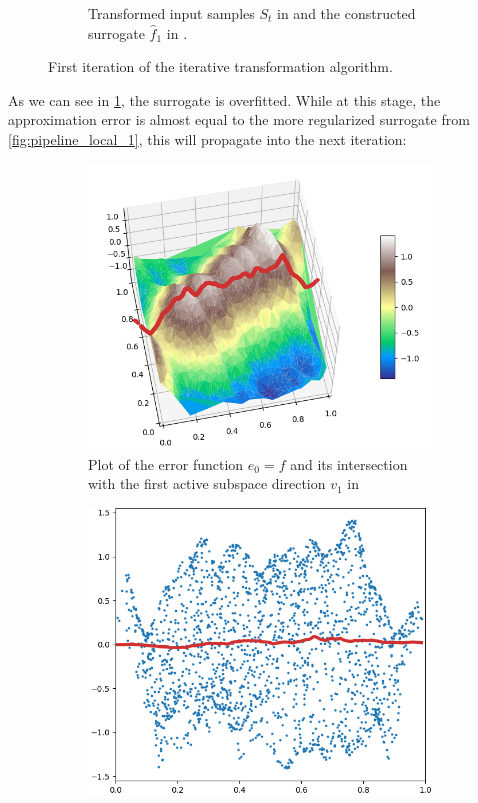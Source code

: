 \documentclass[
  a4paper,  %
  twoside,  %
  bibliography=totoc,
  headsepline,
  cleardoublepage=empty,
  parskip=half,
  draft=false
]{scrbook}
\begin{document}
\begin{mdframed}[style=style]
\begin{figure}[H]
\begin{subfigure}{.5\textwidth}
  \caption{Transformed input samples $S_t$ in \darkblue and the constructed surrogate $\hat{f}_1$ in \red.}
\label{fig:pipeline_bad_local_1}
\end{subfigure}
\delimit
\caption{First iteration of the iterative transformation algorithm.}
\label{fig:pipeline_bad_1}
\end{figure}
\end{mdframed}
%
As we can see in \cref{fig:pipeline_bad_local_1}, the surrogate is overfitted.
While at this stage, the approximation error is almost equal to the more regularized surrogate from \cref{fig:pipeline_local_1}, this will propagate into the next iteration:

\begin{mdframed}[style=style]
\begin{figure}[H]
\begin{subfigure}{.5\textwidth}
  \centering
  \includegraphics[width=.85\linewidth]{graphics/pipeline_bad_current_2.png}
  \caption{Plot of the error function $e_0=f$ and its intersection with the first active subspace direction $v_1$ in \reddot}
\label{fig:pipeline_bad_current_2}
\end{subfigure}%
\begin{subfigure}{.5\textwidth}
  \centering
  \includegraphics[width=.85\linewidth]{graphics/pipeline_bad_local_2.png}

\end{subfigure}
\end{figure}
\end{mdframed}
\end{document}
